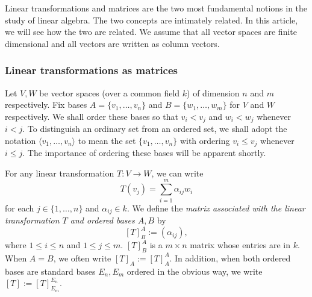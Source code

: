 \documentclass[12pt]{article}
\begin{document}
Linear transformations and matrices are the two most fundamental notions in the study of linear algebra.  The two concepts are intimately related.  In this article, we will see how the two are related.  We assume that all vector spaces are finite dimensional and all vectors are written as column vectors.

\subsubsection*{Linear transformations as matrices}

Let $V,W$ be vector spaces (over a common field $k$) of dimension $n$ and $m$ respectively.  Fix bases $A=\lbrace v_1,\ldots, v_n\rbrace$ and  $B=\lbrace w_1,\ldots, w_m\rbrace$ for $V$ and $W$ respectively.  We shall order these bases so that $v_i < v_j$ and $w_i < w_j$ whenever $i < j$.  To distinguish an ordinary set from an ordered set, we shall adopt the notation $\langle v_1,\ldots, v_n\rangle$ to mean the set $\lbrace v_1,\ldots, v_n\rbrace$ with ordering $v_i\le v_j$ whenever $i\le j$.  The importance of ordering these bases will be apparent shortly.

For any linear transformation $T:V\to W$, we can write $$T(v_j)=\sum_{i=1}^m \alpha_{ij} w_i$$ for each $j\in \lbrace 1,\ldots, n\rbrace$ and $\alpha_{ij}\in k$.  We define the \emph{matrix associated with the linear transformation $T$ and ordered bases $A,B$} by $$[T]^A_B:=(\alpha_{ij}),$$ where $1\le i\le n$ and $1\le j\le m$. $[T]^A_B$ is a $m\times n$ matrix whose entries are in $k$.  When $A=B$, we often write $[T]_A:=[T]^A_A$.  In addition, when both ordered bases are standard bases $E_n,E_m$ ordered in the obvious way, we write $[T]:=[T]^{E_n}_{E_m}$.
\end{document}
